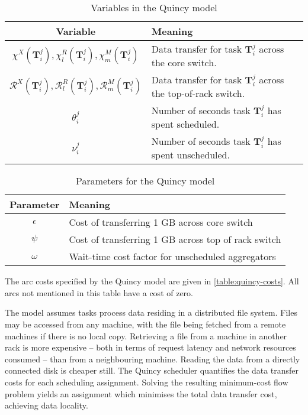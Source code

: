\begin{table}
    \centering
    \begin{tabular}{cl}
        \textbf{Variable} & \textbf{Meaning}\tabularnewline
        \hline 
        $\chi^{X}\left(\mathbf{T}_{i}^{j}\right),\chi_{l}^{R}\left(\mathbf{T}_{i}^{j}\right),\chi_{m}^{M}\left(\mathbf{T}_{i}^{j}\right)$ & Data transfer for task $\mathbf{T}_{i}^{j}$ across the core switch.\tabularnewline %
        $\mathcal{R}^{X}\left(\mathbf{T}_{i}^{j}\right),\mathcal{R}_{l}^{R}\left(\mathbf{T}_{i}^{j}\right),\mathcal{R}_{m}^{M}\left(\mathbf{T}_{i}^{j}\right)$ & Data transfer for task $\mathbf{T}_{i}^{j}$ across the top-of-rack switch.\tabularnewline
        $\theta_{i}^{j}$ & Number of seconds task $\mathbf{T}_{i}^{j}$ has spent scheduled.\tabularnewline
        $\nu_{i}^{j}$ & Number of seconds task $\mathbf{T}_{i}^{j}$ has spent unscheduled.\tabularnewline
    \end{tabular}
    \caption{Variables in the Quincy model}
    \label{table:quincy-variables}
\end{table}

\begin{table}
    \centering
    \begin{tabular}{cl}
        \textbf{Parameter} & \textbf{Meaning}\tabularnewline
        \hline 
        $\epsilon$ & Cost of transferring 1 GB across core switch\tabularnewline
        $\psi$ & Cost of transferring 1 GB across top of rack switch\tabularnewline
        $\omega$ & Wait-time cost factor for unscheduled aggregators\tabularnewline
    \end{tabular}
    \caption{Parameters for the Quincy model}
    \label{table:quincy-parameters}
\end{table}

The arc costs specified by the Quincy model are given in \cref{table:quincy-costs}. All arcs not mentioned in this table have a cost of zero\footnotemark.

The model assumes tasks process data residing in a distributed file system. Files may be accessed from any machine, with the file being fetched from a remote machines if there is no local copy. Retrieving a file from a machine in another rack is more expensive -- both in terms of request latency and network resources consumed -- than from a neighbouring machine. Reading the data from a directly connected disk is cheaper still. The Quincy scheduler quantifies the data transfer costs for each scheduling assignment. Solving the resulting minimum-cost flow problem yields an assignment which minimises the total data transfer cost, achieving data locality.

